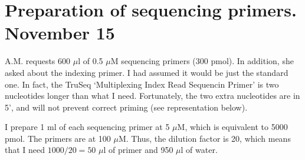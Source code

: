 \documentclass[a4paper,12pt]{article}
\begin{document}
\section{Preparation of sequencing primers. November 15}
A.M. requests 600 $\mu$l of 0.5 $\mu$M sequencing primers (300 pmol). In addition, she asked about the indexing primer. I had assumed it would be just the standard one. In fact, the TruSeq `Multiplexing Index Read Sequencin Primer' is two nucleotides longer than what I need. Fortunately, the two extra nucleotides are in 5', and will not prevent correct priming (see representation below).

I prepare 1 ml of each sequencing primer at 5 $\mu$M, which is equivalent to 5000 pmol. The primers are at 100 $\mu$M. Thus, the dilution factor is 20, which means that I need $1000/20=50$ $\mu$l of primer and 950 $\mu$l of water.
\end{document}
